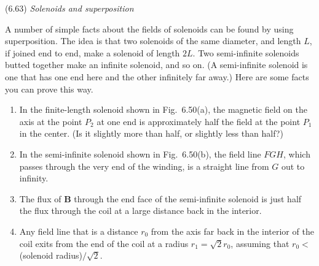 \documentclass{article}
\begin{document}

\begin{homeworkProblem}
	(6.63) \textit{Solenoids and superposition}

	A number of simple facts about the fields of solenoids can be found by using superposition. The idea is that two solenoids of the same diameter, and length $L$, if joined end to end, make a solenoid of length $2L$. Two semi-infinite solenoids butted together make an infinite solenoid, and so on. (A semi-infinite solenoid is one that has one end here and the other infinitely far away.) Here are some facts you can prove this way.

	\begin{enumerate}[label=(\alph*)]
		\item In the finite-length solenoid shown in Fig.~6.50(a), the magnetic field on the axis at the point $P_2$ at one end is approximately half the field at the point $P_1$ in the center. (Is it slightly more than half, or slightly less than half?)
		\item In the semi-infinite solenoid shown in Fig.~6.50(b), the field line $FGH$, which passes through the very end of the winding, is a straight line from $G$ out to infinity.
		\item The flux of $\mathbf{B}$ through the end face of the semi-infinite solenoid is just half the flux through the coil at a large distance back in the interior.
		\item Any field line that is a distance $r_0$ from the axis far back in the interior of the coil exits from the end of the coil at a radius $r_1=\sqrt{2}r_0$, assuming that $r_0<$(solenoid radius)$/\sqrt{2}$.
	\end{enumerate}
	\begin{figure}[H]
		\centering
		\begin{subfigure}[b]{0.5\textwidth}

\end{subfigure}
\end{figure}
\end{homeworkProblem}
\end{document}

